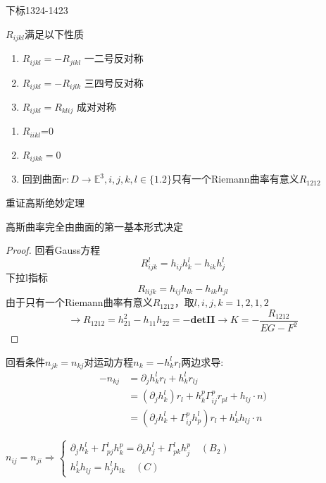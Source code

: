 \documentclass[lang=cn,10pt,thmcnt=section]{elegantbook}
\begin{document}
\begin{remark}
    
    下标1324-1423
\end{remark}

\begin{proposition}
    $R_{ijkl}$满足以下性质
    \begin{enumerate}
        \item $R_{ijkl}=-R_{jikl}$ 一二号反对称
        \item $R_{ijkl}=-R_{ijlk}$ 三四号反对称
        \item $R_{ijkl}=R_{klij}$ 成对对称
    \end{enumerate}
\end{proposition}
\begin{corollary}
    \begin{enumerate}
        \item $ R_{iikl}$=0
        \item $ R_{ijkk}=0$
        \item 回到曲面$r:D\rightarrow \mathbb{E}^3,i,j,k,l\in\{1.2\}$只有一个Riemann曲率有意义$R_{1212}$
    \end{enumerate}
\end{corollary}

重证高斯绝妙定理
\begin{theorem}
高斯曲率完全由曲面的第一基本形式决定
\end{theorem}
\begin{proof}
    回看Gauss方程
    \[R_{ijk}^l=h_{ij}h^l_k-h_{ik}h^l_j\]
    下拉l指标
    \[R_{lijk}=h_{ij}h_{lk}-h_{ik}h_{jl}\]
    由于只有一个Riemann曲率有意义$R_{1212}$，取$l,i,j,k=1,2,1,2$
    \[\rightarrow R_{1212}=h^2_{21}-h_{11}h_{22}=-\mathbf{det II}\rightarrow K=-\frac{R_{1212}}{EG-F^2}
    \]
\end{proof}


回看条件$n_{jk}=n_{kj}$对运动方程$n_k=-h_k^l r_l$两边求导:
\begin{align*}
    -n_{kj}&=\partial_j h^l_k r_l+h^l_k r_{lj}\\
    &=(\partial_j h^l_k)r_l+h^p_k \Gamma_{ij}^p r_{pl} + h_{lj} \cdot n )\\
   &=(\partial_j h^l_k+\Gamma_{ij}^p h^l_p)r_l+h^l_k h_{lj} \cdot n
\end{align*}

$n_{ij}=n_{ji}\Rightarrow \begin{cases}
    \partial_j h^l_k+\Gamma_{pj}^l h^p_k=\partial_k h^l_j+\Gamma_{pk}^l h^p_j\quad(B_2)\label{B2}\\
    h^l_kh_{lj}=h^l_j h_{lk}\quad (C)\label{C}
\end{cases}$
\end{document}
